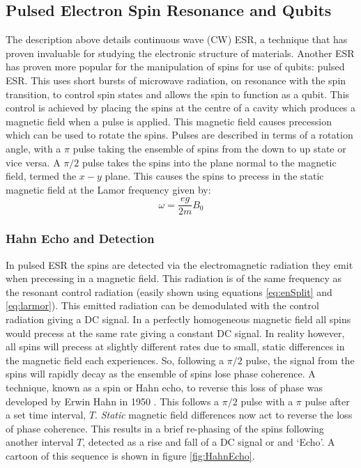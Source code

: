 \subsection{Pulsed Electron Spin Resonance and Qubits}
The description above details continuous wave (CW) ESR, a technique that has proven invaluable for studying the electronic structure of materials.
Another ESR has proven more popular for the manipulation of spins for use of qubits: pulsed ESR.
This uses short bursts of microwave radiation, on resonance with the spin transition, to control spin states and allows the spin to function as a qubit.
This control is achieved by placing the spins at the centre of a cavity which produces a magnetic field when a pulse is applied.
This magnetic field causes precession which can be used to rotate the spins. 
Pulses are described in terms of a rotation angle, with a $\pi$ pulse taking  the ensemble of spins from the down to up state or vice versa. 
A $\pi/2$ pulse takes the spins into the plane normal to the magnetic field, termed the $x-y$ plane. 
This causes the spins to precess in the static magnetic field at the Lamor frequency given by:
\begin{equation}
\label{eq:larmor}
\omega = \frac{eg}{2m}B_0
\end{equation}

\subsubsection{Hahn Echo and Detection}

In pulsed ESR the spins are detected via the electromagnetic radiation they emit when precessing in a magnetic field. 
This radiation is of the same frequency as the resonant control radiation (easily shown using equations \ref{eq:enSplit} and \ref{eq:larmor}).
This emitted radiation can be demodulated with the control radiation giving a DC signal.
In a perfectly homogeneous magnetic field all spins would precess at the same rate giving a constant DC signal. In reality however, all spins will precess at slightly different rates due to small, static differences in the magnetic field each experiences.
So, following a $\pi/2$ pulse, the signal from the spins will rapidly decay as the ensemble of spins lose phase coherence. 
A technique, known as a spin or Hahn echo, to reverse this loss of phase was developed by Erwin Hahn in 1950 \cite{hahn1950}. 
This follows a $\pi/2$ pulse with a $\pi$ pulse after a set time interval, $T$. 
\textit{Static} magnetic field differences now act to reverse the loss of phase coherence. 
This results in a brief re-phasing of the spins following another interval $T$, detected as a rise and fall of a DC signal or and `Echo'.
A cartoon of this sequence is shown in figure \ref{fig:HahnEcho}. 

